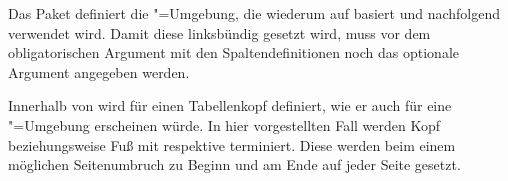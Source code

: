 \documentclass[%
  english,ngerman,%
  geometry=no,DIV=12,automark,%
]{tudscrartcl}
\begin{document}
Das Paket  definiert die "=Umgebung, die 
wiederum auf  basiert und nachfolgend verwendet wird. 
Damit diese linksbündig gesetzt wird, muss vor dem obligatorischen Argument mit 
den Spaltendefinitionen noch das optionale Argument  angegeben 
werden.
%
\InputHook{\let\newglossarystyle\renewglossarystyle}
\begin{Excerpt}
\end{Excerpt}
%
Innerhalb von  wird  für einen
Tabellenkopf definiert, wie er auch für eine "=Umgebung 
erscheinen würde. In hier vorgestellten Fall werden Kopf beziehungsweise Fuß 
mit  respektive  terminiert. Diese werden beim 
einem möglichen Seitenumbruch zu Beginn und am Ende auf jeder Seite gesetzt.
\end{document}
